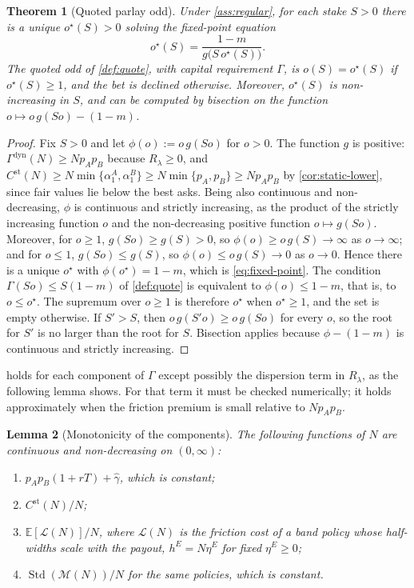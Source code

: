 \documentclass[11pt,a4paper]{article}
\theoremstyle{plain}
\newtheorem{theorem}{Theorem}[section]
\newtheorem{lemma}[theorem]{Lemma}
\theoremstyle{definition}
\theoremstyle{remark}
\newcommand{\E}{\mathbb{E}}
\newcommand{\1}{\mathbf{1}}
\begin{document}
\begin{theorem}[Quoted parlay odd]
\label{thm:odd}
Under \cref{ass:regular}, for each stake $S>0$ there is a unique $o^\star(S)>0$ solving the fixed-point equation
\begin{equation}
\label{eq:fixed-point}
o^\star(S) = \frac{1-m}{g\bigl(S\,o^\star(S)\bigr)}.
\end{equation}
The quoted odd of \cref{def:quote}, with capital requirement $\Gamma$, is $o(S) = o^\star(S)$ if $o^\star(S)\geq 1$, and the bet is declined otherwise. Moreover, $o^\star(S)$ is non-increasing in $S$, and can be computed by bisection on the function $o\mapsto o\,g(So) - (1-m)$.
\end{theorem}

\begin{proof}
Fix $S>0$ and let $\phi(o) := o\,g(So)$ for $o>0$. The function $g$ is positive: $\Gamma^{\mathrm{dyn}}(N)\geq Np_Ap_B$ because $R_\lambda\geq 0$, and $C^{\mathrm{st}}(N)\geq N\min\{\alpha^A_1,\alpha^B_1\}\geq N\min\{p_A,p_B\}\geq Np_Ap_B$ by \cref{cor:static-lower}, since fair values lie below the best asks. Being also continuous and non-decreasing, $\phi$ is continuous and strictly increasing, as the product of the strictly increasing function $o$ and the non-decreasing positive function $o\mapsto g(So)$. Moreover, for $o\geq 1$, $g(So)\geq g(S)>0$, so $\phi(o)\geq o\,g(S)\to\infty$ as $o\to\infty$; and for $o\leq 1$, $g(So)\leq g(S)$, so $\phi(o)\leq o\,g(S)\to 0$ as $o\to 0$. Hence there is a unique $o^\star$ with $\phi(o^\star) = 1-m$, which is \eqref{eq:fixed-point}. The condition $\Gamma(So)\leq S(1-m)$ of \cref{def:quote} is equivalent to $\phi(o)\leq 1-m$, that is, to $o\leq o^\star$. The supremum over $o\geq 1$ is therefore $o^\star$ when $o^\star\geq 1$, and the set is empty otherwise. If $S'>S$, then $o\,g(S'o)\geq o\,g(So)$ for every $o$, so the root for $S'$ is no larger than the root for $S$. Bisection applies because $\phi - (1-m)$ is continuous and strictly increasing.
\end{proof}

 holds for each component of $\Gamma$ except possibly the dispersion term in $R_\lambda$, as the following lemma shows. For that term it must be checked numerically; it holds approximately when the friction premium is small relative to $Np_Ap_B$.

\begin{lemma}[Monotonicity of the components]
\label{lem:monotone}
The following functions of $N$ are continuous and non-decreasing on $(0,\infty)$:
\begin{enumerate}[label=(\alph*)]
  \item $p_Ap_B(1+rT) + \hat\gamma$, which is constant;
  \item $C^{\mathrm{st}}(N)/N$;
  \item $\E[\mathcal{L}(N)]/N$, where $\mathcal{L}(N)$ is the friction cost of a band policy whose half-widths scale with the payout, $h^E = N\eta^E$ for fixed $\eta^E\geq 0$;
  \item $\operatorname{Std}(\mathcal{M}(N))/N$ for the same policies, which is constant.
\end{enumerate}
\end{lemma}
\end{document}
